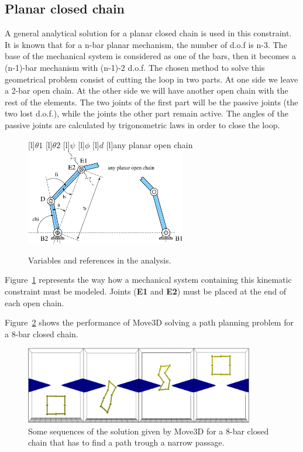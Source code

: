\subsection*{Planar closed chain}

A general analytical solution for a planar closed
chain is used in this constraint. It is known that for a n-bar planar mechanism, the number of
d.o.f is n-3. The base of the mechanical system is considered as one
of the bars, then it becomes a (n-1)-bar mechanism with (n-1)-2 d.o.f.
The chosen method to solve this geometrical problem
consist of cutting the loop in two parts. At one side we leave a 2-bar
open chain. At the other side we will have another open chain with the
rest of the elements. The two joints of the first part will be the
passive joints (the two lost d.o.f.), while the joints the other part
remain active. The angles of the passive joints are calculated by
trigonometric laws in order to close the loop.

\begin{figure}[h!]
\begin{center}
[l]{$\theta 1$} 
[l]{$\theta 2$}
[l]{$\psi$}
[l]{$\phi$}
[l]{$d$}
[l]{any planar open chain}
  \includegraphics[width=7cm]{FIG/Constraint/plclch.eps}
\end{center}
\caption{\label{fig:plclch} Variables and references in the analysis.}
\end{figure}

Figure~\ref{fig:plclch} represents the way how a mechanical system 
containing this kinematic constraint must be modeled. Joints ({\bf E1}
and {\bf E2}) must be placed at the end of each open chain.

Figure~\ref{fig:cad8pas} shows the performance of Move3D solving a 
path planning problem for a 8-bar closed chain.

\begin{figure}[h!]
\begin{center}
  \includegraphics[width=10cm]{FIG/Constraint/cad8pas.eps}
\end{center}
\caption{\label{fig:cad8pas} Some sequences of the solution given
  by Move3D for a 8-bar closed chain that has to find a path trough a
  narrow passage.}
\end{figure}

